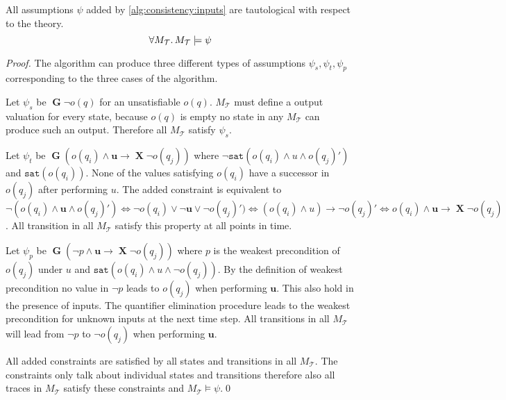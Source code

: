 \documentclass[runningheads]{llncs}
\newcommand{\globally}{\operatorname{\mathbf{G}}}
\newcommand{\lnext}{\operatorname{\mathbf{X}}}
\newcommand{\theory}{\mathcal{T}}
\newcommand{\updf}{\mathbf{u}}
\newcommand{\sat}[1]{\texttt{sat}(#1)}
\begin{document}
\begin{lemma}
All assumptions $\psi$ added by \cref{alg:consistency:inputs} are tautological with respect to the theory.
$$\forall M_\theory \ldotp M_\theory \models \psi$$

\label{lem:tautogicalAssumptions}
\end{lemma}
\begin{proof}
The algorithm can produce three different types of assumptions $\psi_s, \psi_t, \psi_p$ corresponding to the three cases of the algorithm.

Let $\psi_s$ be $\globally \neg o(q)$ for an unsatisfiable $o(q)$.
$M_\theory$ must define a output valuation for every state, because $o(q)$ is empty no state in any $M_\theory$ can produce such an output.
Therefore all $M_\theory$ satisfy $\psi_s$.

Let $\psi_t$ be $\globally ( o(q_i) \wedge \updf \rightarrow \lnext \neg o(q_j))$ where $\neg \sat{ o(q_i) \wedge u \wedge  o(q_j)' }$ and $\sat{o(q_i)}$. None of the values satisfying $o(q_i)$ have a successor in $o(q_j)$ after performing $u$.
The added constraint is equivalent to $\neg( o(q_i) \wedge \updf \wedge  o(q_j)' ) \Leftrightarrow \neg o(q_i) \lor \neg \updf \lor  \neg o(q_j)' ) \Leftrightarrow (o(q_i) \land u) \rightarrow \neg o(q_j)' \Leftrightarrow o(q_i) \wedge \updf \rightarrow \lnext \neg o(q_j)$.
All transition in all $M_\theory$ satisfy this property at all points in time.

Let $\psi_p$ be $\globally( \neg p \wedge \updf \rightarrow \lnext \neg o(q_j))$ where $p$ is the weakest precondition of $o(q_j)$ under $u$ and $\sat{ o(q_i) \land u \land \neg o(q_j)}$.
By the definition of weakest precondition no value in $\neg p$ leads to $o(q_j)$ when performing $\updf$.
This also hold in the presence of inputs. The quantifier elimination procedure leads to the weakest precondition for unknown inputs at the next time step.
All transitions in all $M_\theory$ will lead from $\neg p$ to $\neg o(q_j)$ when performing $\updf$.

All added constraints are satisfied by all states and transitions in all $M_\theory$. The constraints only talk about individual states and transitions therefore also all traces in $M_\theory$ satisfy these constraints and $M_\theory \models \psi$.\qed
\end{proof}


\end{document}
